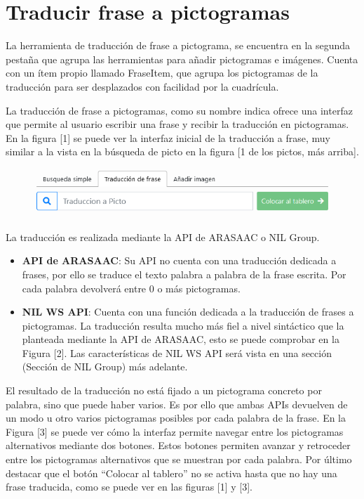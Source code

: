 \section{Traducir frase a pictogramas}

La herramienta de traducción de frase a pictograma, se encuentra en la segunda pestaña que agrupa las herramientas para añadir pictogramas e imágenes. Cuenta con un ítem propio llamado FraseItem, que agrupa los pictogramas de la traducción para ser desplazados con facilidad  por la cuadrícula.

La traducción de frase a pictogramas, como su nombre indica ofrece una interfaz que permite al usuario escribir una frase y recibir la traducción en pictogramas. En la figura [1] se puede ver la interfaz inicial de la traducción a frase, muy similar a la vista en la búsqueda de picto en la figura [1 de los pictos, más arriba]. 

\begin{figure}[h!]
	\centering
	\includegraphics[width=0.7\linewidth]{Imagenes/Bitmap/traducirFraseInicial}
	\caption{}
	\label{fig:traducirfraseinicial}
\end{figure}


La traducción es realizada mediante la API de ARASAAC o NIL Group.


\begin{itemize}
	\item \textbf{API de ARASAAC}: Su API no cuenta con una traducción dedicada a frases, por ello se traduce el texto palabra a palabra de la frase escrita. Por cada palabra devolverá entre 0 o más pictogramas.
	\item \textbf{NIL WS API}:  Cuenta con una función dedicada a la traducción de frases a pictogramas. La traducción resulta mucho más fiel a nivel sintáctico que la planteada  mediante la API de ARASAAC, esto se puede comprobar en la Figura [2]. Las características de NIL WS API será vista en una sección (Sección de NIL Group) más adelante.
\end{itemize}

El resultado de la traducción no está fijado a un pictograma concreto por palabra, sino que puede haber varios. Es por ello que ambas APIs devuelven de un modo u otro varios pictogramas posibles por cada palabra de la frase.  En la Figura [3] se puede ver cómo la interfaz permite navegar entre los pictogramas alternativos mediante dos botones.
Estos botones permiten avanzar y retroceder entre los pictogramas alternativos que se muestran por cada palabra. Por último destacar que el botón “Colocar al tablero” no se activa hasta que no hay una frase traducida, como se puede ver en las figuras [1] y [3]. 

